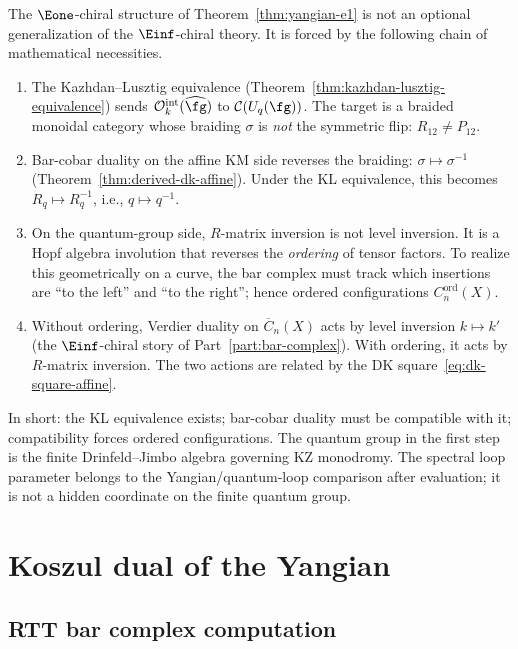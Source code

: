 \begin{remark}
\label{rem:ordered-forced}
The $\Eone$-chiral structure of Theorem~\ref{thm:yangian-e1} is
not an optional generalization of the $\Einf$-chiral theory. It is
forced by the following chain of mathematical necessities.
\begin{enumerate}[label=\textup{(\arabic*)}]
\item The Kazhdan--Lusztig equivalence
 (Theorem~\ref{thm:kazhdan-lusztig-equivalence}) sends
 $\mathcal{O}_k^{\mathrm{int}}(\widehat{\fg})$ to
 $\mathcal{C}(U_q(\fg))$. The target is a braided monoidal
 category whose braiding $\sigma$ is \emph{not} the symmetric
 flip: $R_{12} \neq P_{12}$.
\item Bar-cobar duality on the affine KM side reverses the braiding:
 $\sigma \mapsto \sigma^{-1}$
 (Theorem~\ref{thm:derived-dk-affine}). Under the KL
 equivalence, this becomes $R_q \mapsto R_q^{-1}$, i.e.,
 $q \mapsto q^{-1}$.
\item On the quantum-group side, $R$-matrix inversion is not
 level inversion. It is a Hopf algebra involution that
 reverses the \emph{ordering} of tensor factors. To realize
 this geometrically on a curve, the bar complex must track
 which insertions are ``to the left'' and ``to the right'';
 hence ordered configurations $C_n^{\mathrm{ord}}(X)$.
\item Without ordering, Verdier duality on
 $\overline{C}_n(X)$ acts by level inversion $k \mapsto k'$
 (the $\Einf$-chiral story of Part~\ref{part:bar-complex}). With ordering, it
 acts by $R$-matrix inversion. The two actions are related
 by the DK square~\eqref{eq:dk-square-affine}.
\end{enumerate}
In short: the KL equivalence exists; bar-cobar duality must be
compatible with it; compatibility forces ordered configurations.
The quantum group in the first step is the finite Drinfeld--Jimbo
algebra governing KZ monodromy. The spectral loop parameter belongs
to the Yangian/quantum-loop comparison after evaluation; it is not a
hidden coordinate on the finite quantum group.
\end{remark}

\section{Koszul dual of the Yangian}\label{sec:yangian-koszul}

\subsection{RTT bar complex computation}

